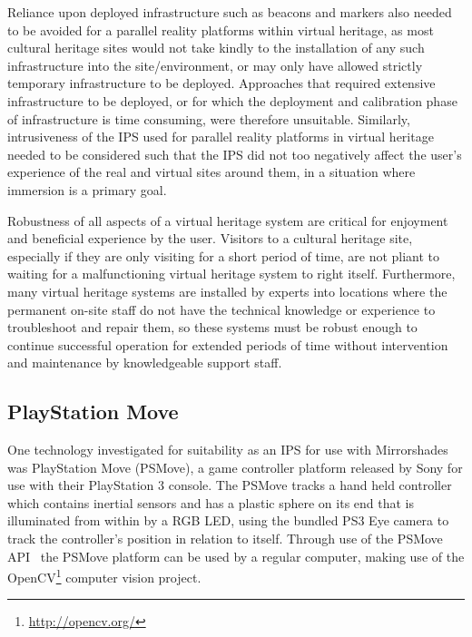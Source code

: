 Reliance upon deployed infrastructure such as beacons and markers also needed to be avoided for a parallel reality platforms within virtual heritage, as most cultural heritage sites would not take kindly to the installation of any such infrastructure into the site/environment, or may only have allowed strictly temporary infrastructure to be deployed. Approaches that required extensive infrastructure to be deployed, or for which the deployment and calibration phase of infrastructure is time consuming, were therefore unsuitable. Similarly, intrusiveness of the IPS used for parallel reality platforms in virtual heritage needed to be considered such that the IPS did not too negatively affect the user's experience of the real and virtual sites around them, in a situation where immersion is a primary goal.

Robustness of all aspects of a virtual heritage system are critical for enjoyment and beneficial experience by the user. Visitors to a cultural heritage site, especially if they are only visiting for a short period of time, are not pliant to waiting for a malfunctioning virtual heritage system to right itself. Furthermore, many virtual heritage systems are installed by experts into locations where the permanent on-site staff do not have the technical knowledge or experience to troubleshoot and repair them, so these systems must be robust enough to continue successful operation for extended periods of time without intervention and maintenance by knowledgeable support staff.



\subsection{PlayStation Move}
\label{psmove}
One technology investigated for suitability as an IPS for use with Mirrorshades was PlayStation Move (PSMove), a game controller platform released by Sony for use with their PlayStation 3 console. The PSMove tracks a hand held controller which contains inertial sensors and has a plastic sphere on its end that is illuminated from within by a RGB LED, using the bundled PS3 Eye camera to track the controller's position in relation to itself. Through use of the PSMove API~\cite{Perl2012} the PSMove platform can be used by a regular computer, making use of the OpenCV\footnote{\url{http://opencv.org/}} computer vision project.

